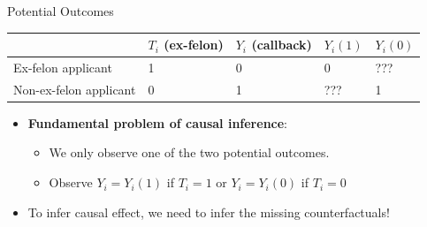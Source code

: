 \documentclass[
  ignorenonframetext,
]{beamer}
\providecommand{\tightlist}{%
  \setlength{\itemsep}{0pt}\setlength{\parskip}{0pt}}
\begin{document}
\begin{frame}{Potential Outcomes}
\label{potential-outcomes}
\begin{center}  
\begin{tabular}{ l | l  l  l  l}
     & $T_i$ (ex-felon)  & $Y_i$ (callback) & $Y_i (1)$ & $Y_i (0)$ \\ \hline
    Ex-felon applicant & 1 & 0 & 0 & ???\\ 
    Non-ex-felon applicant & 0  & 1 & ??? & 1 \\ 
\end{tabular}
\end{center}  \pause

\begin{itemize}
\tightlist
\item
  \textbf{Fundamental problem of causal inference}: \pause

  \begin{itemize}
  \tightlist
  \item
    We only observe one of the two potential outcomes. \pause
  \item
    Observe \(Y_i = Y_i (1)\) if \(T_i = 1\) or \(Y_i = Y_i (0)\) if
    \(T_i = 0\) \pause
  \end{itemize}
\item
  To infer causal effect, we need to infer the missing counterfactuals!
\end{itemize}
\end{frame}
\end{document}
